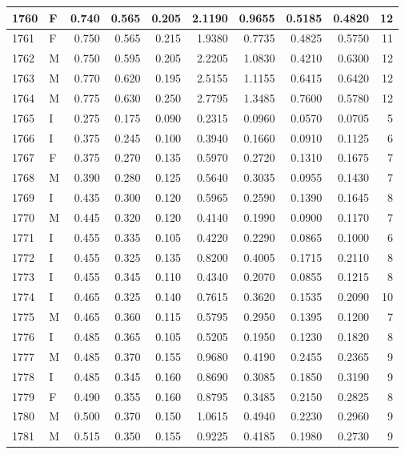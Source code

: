 \documentclass[9pt,twocolumn,twoside,]{pnas-new}
\begin{document}
\begin{tabular}{l|l|r|r|r|r|r|r|r|r}
\hline
1760 & F & 0.740 & 0.565 & 0.205 & 2.1190 & 0.9655 & 0.5185 & 0.4820 & 12\\
\hline
1761 & F & 0.750 & 0.565 & 0.215 & 1.9380 & 0.7735 & 0.4825 & 0.5750 & 11\\
\hline
1762 & M & 0.750 & 0.595 & 0.205 & 2.2205 & 1.0830 & 0.4210 & 0.6300 & 12\\
\hline
1763 & M & 0.770 & 0.620 & 0.195 & 2.5155 & 1.1155 & 0.6415 & 0.6420 & 12\\
\hline
1764 & M & 0.775 & 0.630 & 0.250 & 2.7795 & 1.3485 & 0.7600 & 0.5780 & 12\\
\hline
1765 & I & 0.275 & 0.175 & 0.090 & 0.2315 & 0.0960 & 0.0570 & 0.0705 & 5\\
\hline
1766 & I & 0.375 & 0.245 & 0.100 & 0.3940 & 0.1660 & 0.0910 & 0.1125 & 6\\
\hline
1767 & F & 0.375 & 0.270 & 0.135 & 0.5970 & 0.2720 & 0.1310 & 0.1675 & 7\\
\hline
1768 & M & 0.390 & 0.280 & 0.125 & 0.5640 & 0.3035 & 0.0955 & 0.1430 & 7\\
\hline
1769 & I & 0.435 & 0.300 & 0.120 & 0.5965 & 0.2590 & 0.1390 & 0.1645 & 8\\
\hline
1770 & M & 0.445 & 0.320 & 0.120 & 0.4140 & 0.1990 & 0.0900 & 0.1170 & 7\\
\hline
1771 & I & 0.455 & 0.335 & 0.105 & 0.4220 & 0.2290 & 0.0865 & 0.1000 & 6\\
\hline
1772 & I & 0.455 & 0.325 & 0.135 & 0.8200 & 0.4005 & 0.1715 & 0.2110 & 8\\
\hline
1773 & I & 0.455 & 0.345 & 0.110 & 0.4340 & 0.2070 & 0.0855 & 0.1215 & 8\\
\hline
1774 & I & 0.465 & 0.325 & 0.140 & 0.7615 & 0.3620 & 0.1535 & 0.2090 & 10\\
\hline
1775 & M & 0.465 & 0.360 & 0.115 & 0.5795 & 0.2950 & 0.1395 & 0.1200 & 7\\
\hline
1776 & I & 0.485 & 0.365 & 0.105 & 0.5205 & 0.1950 & 0.1230 & 0.1820 & 8\\
\hline
1777 & M & 0.485 & 0.370 & 0.155 & 0.9680 & 0.4190 & 0.2455 & 0.2365 & 9\\
\hline
1778 & I & 0.485 & 0.345 & 0.160 & 0.8690 & 0.3085 & 0.1850 & 0.3190 & 9\\
\hline
1779 & F & 0.490 & 0.355 & 0.160 & 0.8795 & 0.3485 & 0.2150 & 0.2825 & 8\\
\hline
1780 & M & 0.500 & 0.370 & 0.150 & 1.0615 & 0.4940 & 0.2230 & 0.2960 & 9\\
\hline
1781 & M & 0.515 & 0.350 & 0.155 & 0.9225 & 0.4185 & 0.1980 & 0.2730 & 9\\

\end{tabular}
\end{document}
